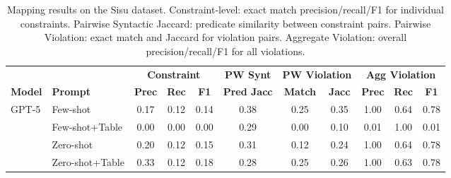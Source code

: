 \begin{table}[htbp]
\centering
\small
\caption{Mapping results on the Sisu dataset. Constraint-level: exact match precision/recall/F1 for individual constraints. Pairwise Syntactic Jaccard: predicate similarity between constraint pairs. Pairwise Violation: exact match and Jaccard for violation pairs. Aggregate Violation: overall precision/recall/F1 for all violations.}
\label{tab:mapping_results_sisu}
\begin{tabular}{@{}llccccccccc@{}}
\toprule
 & & \multicolumn{3}{c}{\textbf{Constraint}} & \textbf{PW Synt} & \multicolumn{2}{c}{\textbf{PW Violation}} & \multicolumn{3}{c}{\textbf{Agg Violation}} \\
\cmidrule(lr){3-5} \cmidrule(lr){6-6} \cmidrule(lr){7-8} \cmidrule(lr){9-11}
\textbf{Model} & \textbf{Prompt} & \textbf{Prec} & \textbf{Rec} & \textbf{F1} & \textbf{Pred Jacc} & \textbf{Match} & \textbf{Jacc} & \textbf{Prec} & \textbf{Rec} & \textbf{F1} \\
\midrule
\multirow{4}{*}{GPT-5} & Few-shot & 0.17 & 0.12 & 0.14 & 0.38 & 0.25 & 0.35 & 1.00 & 0.64 & 0.78 \\
 & Few-shot+Table & 0.00 & 0.00 & 0.00 & 0.29 & 0.00 & 0.10 & 0.01 & 1.00 & 0.01 \\
 & Zero-shot & 0.20 & 0.12 & 0.15 & 0.31 & 0.12 & 0.24 & 1.00 & 0.64 & 0.78 \\
 & Zero-shot+Table & 0.33 & 0.12 & 0.18 & 0.28 & 0.25 & 0.26 & 1.00 & 0.63 & 0.78 \\
\bottomrule
\end{tabular}
\end{table}